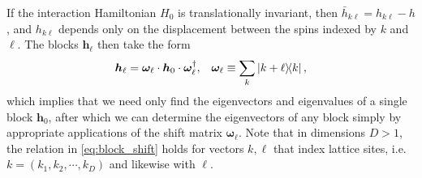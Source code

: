 \documentclass[nofootinbib,notitlepage,11pt]{revtex4-2}
\newcommand{\p}[1]{\left(#1\right)} %
\renewcommand{\c}{\cdot} %
\newcommand{\m}{\bm} %
\newcommand{\1}{\mathds{1}}
\begin{document}
If the interaction Hamiltonian $H_0$ is translationally invariant,
then $\bar h_{k\ell}=h_{k\ell}-h$, and $h_{k\ell}$ depends only on the
displacement between the spins indexed by $k$ and $\ell$.  The blocks
$\m h_\ell$ then take the form
\begin{align}
  \m h_{\ell} = \m\omega_\ell \c \m h_0 \c \m\omega_\ell^\dag,
  &&
  \m\omega_\ell \equiv \sum_k \op{k+\ell}{k},
  \label{eq:block_shift}
\end{align}
which implies that we need only find the eigenvectors and eigenvalues
of a single block $\m h_0$, after which we can determine the
eigenvectors of any block simply by appropriate applications of the
shift matrix $\m\omega_\ell$.  Note that in dimensions $D>1$, the
relation in \eqref{eq:block_shift} holds for vectors $k,\ell$ that
index lattice sites, i.e.~$k=\p{k_1,k_2,\cdots,k_D}$ and likewise with
$\ell$.


\end{document}
